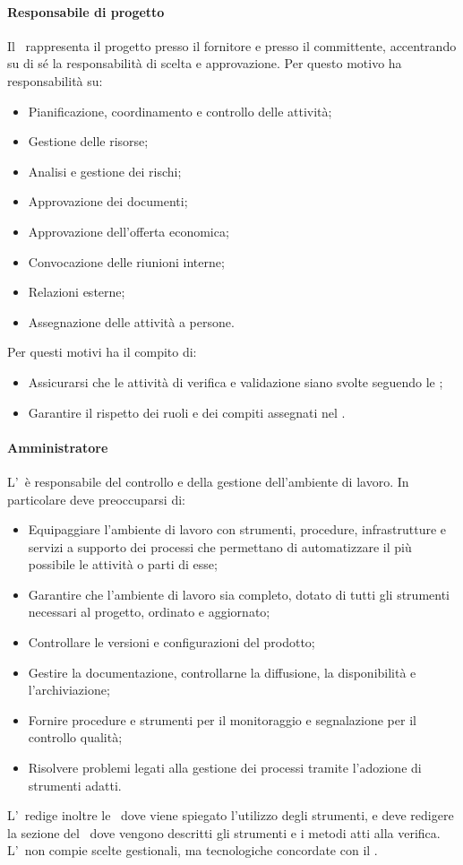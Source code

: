 \documentclass[../NormeProgetto.tex]{subfiles}
\begin{document}
			\paragraph{Responsabile di progetto}
			Il \responsabilediprogetto\ rappresenta il progetto presso il fornitore e presso il committente, accentrando su di sé la responsabilità di scelta e approvazione. Per questo motivo ha responsabilità su:
			\begin{itemize}
			\item Pianificazione, coordinamento e controllo delle attività;
			\item Gestione delle risorse;
			\item Analisi e gestione dei rischi;
			\item Approvazione dei documenti;
			\item Approvazione dell'offerta economica;
			\item Convocazione delle riunioni interne;
			\item Relazioni esterne;
			\item Assegnazione delle attività a persone.
			\end{itemize}
			Per questi motivi ha il compito di:
			\begin{itemize}
			\item Assicurarsi che le attività di verifica e validazione siano svolte seguendo le \normediprogetto;
			\item Garantire il rispetto dei ruoli e dei compiti assegnati nel \pianodiprogetto.
			\end{itemize}
			\paragraph{Amministratore}
			L'\amministratore\ è responsabile del controllo e della gestione dell'ambiente di lavoro. In particolare deve preoccuparsi di:
			\begin{itemize}
			\item Equipaggiare l'ambiente di lavoro con strumenti, procedure, infrastrutture e servizi a supporto dei processi che permettano di automatizzare il più possibile le attività o parti di esse;
			\item Garantire che l'ambiente di lavoro sia completo, dotato di tutti gli strumenti necessari al progetto, ordinato e aggiornato;
			\item Controllare le versioni e configurazioni del prodotto\g;
			\item Gestire la documentazione, controllarne la diffusione, la disponibilità e l'archiviazione;
			\item Fornire procedure e strumenti per il monitoraggio e segnalazione per il controllo qualità;
			\item Risolvere problemi legati alla gestione dei processi tramite l'adozione di strumenti adatti.
			\end{itemize}
			L'\amministratore\ redige inoltre le \normediprogetto\, dove viene spiegato l'utilizzo degli strumenti, e deve redigere la sezione del \pianodiqualifica\ dove vengono descritti gli strumenti e i metodi atti alla verifica. L'\amministratore\ non compie scelte gestionali, ma tecnologiche concordate con il \responsabilediprogetto.
\end{document}

